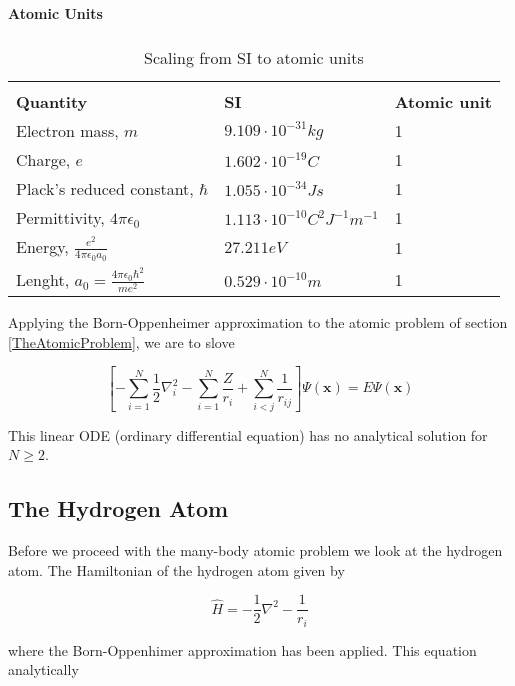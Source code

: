 \begin{table}[hbtp]
\begin{center} {\large \bf Atomic Units} \\ 
$\phantom{a}$ \\
\begin{tabular}{lll}
\hline\\ 
{\bf Quantity}                 & {\bf SI}               & {\bf Atomic unit}\\
Electron mass, $m$               & $9.109\cdot 10^{-31} kg$ & 1 \\
Charge, $e$                      & $1.602\cdot 10^{-19} C$  & 1 \\
Plack's reduced constant, $\hbar$& $1.055\cdot 10^{-34} J s$& 1 \\       
Permittivity, $4\pi\epsilon_0$   & $1.113\cdot 10^{-10} C^2 J^{-1} m^{-1}$&1\\
Energy, $\frac{e^2}{4\pi\epsilon_0 a_0}$ & $27.211 eV$       & 1 \\
Lenght, $a_0=\frac{4\pi\epsilon_0 \hbar^2}{me^2}$&$0.529\cdot10^{-10} m$&1\\       
\hline
\end{tabular} 
\end{center}
\caption{Scaling from SI to atomic units}
\label{atomicUnits}
\end{table}

Applying the Born-Oppenheimer approximation to the atomic problem of
section \ref{TheAtomicProblem}, we are to slove

\begin{equation}
  \left[-\sum_{i=1}^N \frac{1}{2} \nabla^2_i 
    - \sum_{i=1}^N \frac{Z}{r_i} + \sum_{i<j}^N \frac{1}{r_{ij}} 
    \right] \Psi(\mathbf{x}) = E \Psi(\mathbf{x})
  \label{SchrodingerBornOppenheimerAtomicUnits}
\end{equation}

This linear ODE (ordinary differential equation) has no analytical
solution for $N \ge 2$.

\subsection{The Hydrogen Atom}

Before we proceed with the many-body atomic problem we look at the
hydrogen atom. The Hamiltonian of the hydrogen atom given by

\begin{equation}
  \hat{H} = -\frac{1}{2} \nabla^2  - \frac{1}{r_i} 
  \label{HydrogenHamiltonian}
\end{equation}

where the Born-Oppenhimer approximation has been applied. This
equation analytically 
